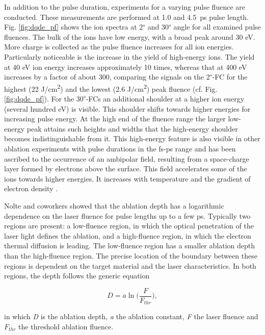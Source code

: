 \documentclass[aip, jap, reprint, amsmath, amssymb]{revtex4-1}
\begin{document}
In addition to the pulse duration, experiments for a varying pulse fluence are conducted. These measurements are performed at 1.0 and \mbox{4.5 ps} pulse length. Fig. \ref{fig:dqde_pf} shows the ion spectra at 2\textsuperscript{$\circ$} and 30\textsuperscript{$\circ$} angle for all examined pulse fluences. The bulk of the ions have low energy, with a broad peak around 30 eV. More charge is collected as the pulse fluence increases for all ion energies. Particularly noticeable is the increase in the yield of high-energy ions. The yield at 40 eV ion energy increases approximately 10 times, whereas that at 400 eV increases by a factor of about 300, comparing the signals on the 2\textsuperscript{$\circ$}-FC for the highest (22 J/cm\textsuperscript{2}) and the lowest (2.6 J/cm\textsuperscript{2}) peak fluence (cf. Fig. \ref{fig:dqde_pf}). For the 30\textsuperscript{$\circ$}-FCs an additional shoulder at a higher ion energy (several hundred eV) is visible. This shoulder shifts towards higher energies for increasing pulse energy. At the high end of the fluence range the larger low-energy peak attains such heights and widths that the high-energy shoulder becomes indistinguishable from it. This high-energy feature is also visible in other ablation experiments with pulse durations in the fs-ps range \cite{amoruso2002,verhoff2012} and has been ascribed to the occurrence of an ambipolar field, resulting from a space-charge layer formed by electrons above the surface. This field accelerates some of the ions towards higher energies. It increases with temperature and the gradient of electron density \cite{doggett2011}.

Nolte and coworkers \cite{nolte1997} showed that the ablation depth has a logarithmic dependence on the laser fluence for pulse lengths up to a few ps. Typically two regions are present: a low-fluence region, in which the optical penetration of the laser light defines the ablation, and a high-fluence region, in which the electron thermal diffusion is leading. The low-fluence region has a smaller ablation depth than the high-fluence region. The precise location of the boundary between these regions is dependent on the target material and the laser characteristics.  In both regions, the depth follows the generic equation\cite{chichkov1996}

\begin{equation}
D=a\ln\bigg(\frac{F}{F_{thr}}\bigg),
\label{eq:depth_pf}
\end{equation}


\noindent in which \textit{D} is the ablation depth, \textit{a} the ablation constant, \textit{F} the laser fluence and $F_{thr}$ the threshold ablation fluence. 
\end{document}
